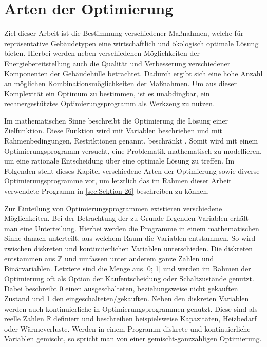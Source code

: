 \section{Arten der Optimierung}
\label{sec:Sektion 25}

Ziel dieser Arbeit ist die Bestimmung verschiedener Maßnahmen, welche für repräsentative Gebäudetypen eine wirtschaftlich und ökologisch optimale Lösung bieten.
Hierbei werden neben verschiedenen Möglichkeiten der Energiebereitstellung auch die Qualität und Verbesserung verschiedener Komponenten der Gebäudehülle betrachtet.
Dadurch ergibt sich eine hohe Anzahl an möglichen Kombinationsmöglichkeiten der Maßnahmen.
Um aus dieser Komplexität ein Optimum zu bestimmen, ist es unabdingbar, ein rechnergestütztes Optimierungsprogramm als Werkzeug zu nutzen.

Im mathematischen Sinne beschreibt die Optimierung die Lösung einer Zielfunktion.
Diese Funktion wird mit Variablen beschrieben und mit Rahmenbedingungen, Restriktionen genannt, beschränkt \cite{Schellong.2016}.
Somit wird mit einem Optimierungsprogramm versucht, eine Problematik mathematisch zu modellieren, um eine rationale Entscheidung über eine optimale Lösung zu treffen. 
Im Folgenden stellt dieses Kapitel verschiedene Arten der Optimierung sowie diverse Optimierungsprogramme vor, um letztlich das im Rahmen dieser Arbeit verwendete Programm in \ref{sec:Sektion 26} beschreiben zu können.

Zur Einteilung von Optimierungsprogrammen existieren verschiedene Möglichkeiten.
Bei der Betrachtung der zu Grunde liegenden Variablen erhält man eine Unterteilung.
Hierbei werden die Programme in einem mathematischen Sinne danach unterteilt, aus welchem Raum die Variablen entstammen.
So wird zwischen diskreten und kontinuierlichen Variablen unterschieden. 
Die diskreten entstammen aus \(\mathbb{Z	}\) und umfassen unter anderem ganze Zahlen und Binärvariablen.
Letztere sind die Menge aus [0; 1] und werden im Rahmen der Optimierung oft als Option der Kaufentscheidung oder Schaltzustände genutzt. %
Dabei beschreibt 0 einen ausgeschalteten, beziehungsweise nicht gekauften Zustand und 1 den eingeschalteten/gekauften.
Neben den diskreten Variablen werden auch kontinuierliche in Optimierungsprogrammen genutzt. 
Diese sind als reelle Zahlen \(\mathbb{R}\) definiert und beschreiben beispielsweise Kapazitäten, Heizbedarf oder Wärmeverluste.
Werden in einem Programm diskrete und kontinuierliche Variablen gemischt, so spricht man von einer gemischt-ganzzahligen Optimierung. \cite{Schellong.2016}

